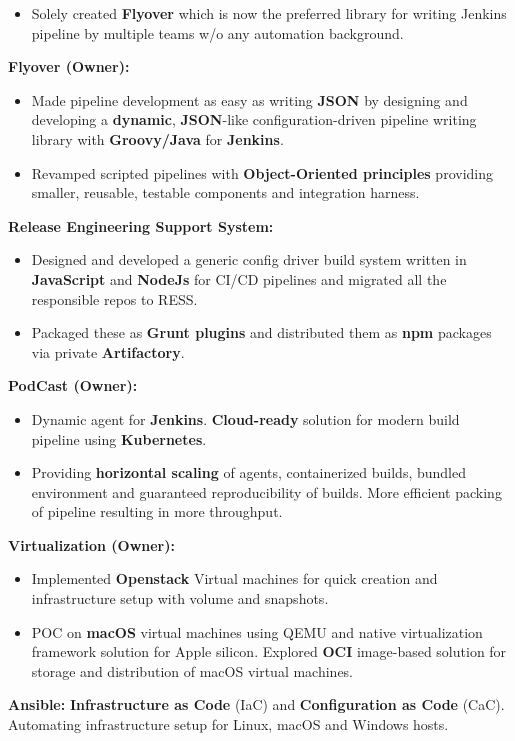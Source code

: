 \begin{cventries}
{\begin{itemize}
            \item Solely created \textbf{Flyover} which is now the preferred library for writing Jenkins pipeline by multiple teams w/o any automation background.
        \end{itemize}
        \item \textbf{Flyover (Owner):}
        \begin{itemize}
            \item Made pipeline development as easy as writing \textbf{JSON} by designing and developing a \textbf{dynamic}, \textbf{JSON}-like configuration-driven pipeline writing library with \textbf{Groovy/Java} for \textbf{Jenkins}.
            \item Revamped scripted pipelines with \textbf{Object-Oriented principles} providing smaller, reusable, testable components and integration harness.
        \end{itemize}
        \item \textbf{Release Engineering Support System:} 
        \begin{itemize}
            \item Designed and developed a generic config driver build system written in \textbf{JavaScript} and \textbf{NodeJs} for CI/CD pipelines and migrated all the responsible repos to RESS. 
            \item Packaged these as \textbf{Grunt plugins} and distributed them as \textbf{npm} packages via private \textbf{Artifactory}.
        \end{itemize}
        \item \textbf{PodCast (Owner):} 
        \begin{itemize}
            \item Dynamic agent for \textbf{Jenkins}. \textbf{Cloud-ready} solution for modern build pipeline using \textbf{Kubernetes}. 
            \item Providing \textbf{horizontal scaling} of agents, containerized builds, bundled environment and guaranteed reproducibility of builds. More efficient packing of pipeline resulting in more throughput.
        \end{itemize}
        \item \textbf{Virtualization (Owner):}
        \begin{itemize}
            \item Implemented \textbf{Openstack} Virtual machines for quick creation and infrastructure setup with volume and snapshots.
            \item POC on \textbf{macOS} virtual machines using QEMU and native virtualization framework solution for Apple silicon. Explored \textbf{OCI} image-based solution for storage and distribution of macOS virtual machines.
        \end{itemize}
        \item \textbf{Ansible:} \textbf{Infrastructure as Code} (IaC) and \textbf{Configuration as Code} (CaC). Automating infrastructure setup for Linux, macOS and Windows hosts.
    }


\end{cventries}
